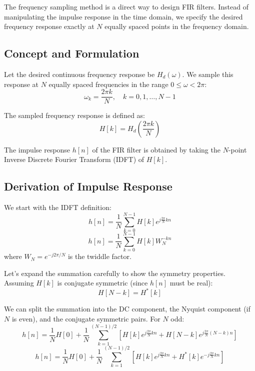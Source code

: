 \documentclass[11pt,a4paper]{article}
\begin{document}
The frequency sampling method is a direct way to design FIR filters. Instead of manipulating the impulse response in the time domain, we specify the desired frequency response exactly at $N$ equally spaced points in the frequency domain.

\subsection{Concept and Formulation}
Let the desired continuous frequency response be $H_d(\omega)$. We sample this response at $N$ equally spaced frequencies in the range $0 \le \omega < 2\pi$:
\begin{equation}
\omega_k = \frac{2\pi k}{N}, \quad k = 0, 1, \dots, N-1
\end{equation}

The sampled frequency response is defined as:
\begin{equation}
H[k] = H_d\left(\frac{2\pi k}{N}\right)
\end{equation}

The impulse response $h[n]$ of the FIR filter is obtained by taking the $N$-point Inverse Discrete Fourier Transform (IDFT) of $H[k]$.

\subsection{Derivation of Impulse Response}
We start with the IDFT definition:
\begin{equation}
h[n] = \frac{1}{N} \sum_{k=0}^{N-1} H[k] e^{j \frac{2\pi}{N} kn}
\end{equation}
\begin{equation}
h[n] = \frac{1}{N} \sum_{k=0}^{N-1} H[k] W_N^{-kn}
\end{equation}
where $W_N = e^{-j 2\pi / N}$ is the twiddle factor.

Let's expand the summation carefully to show the symmetry properties. Assuming $H[k]$ is conjugate symmetric (since $h[n]$ must be real):
\begin{equation}
H[N-k] = H^*[k]
\end{equation}

We can split the summation into the DC component, the Nyquist component (if $N$ is even), and the conjugate symmetric pairs. For $N$ odd:
\begin{equation}
h[n] = \frac{1}{N} H[0] + \frac{1}{N} \sum_{k=1}^{(N-1)/2} \left[ H[k] e^{j \frac{2\pi}{N} kn} + H[N-k] e^{j \frac{2\pi}{N} (N-k)n} \right]
\end{equation}
\begin{equation}
h[n] = \frac{1}{N} H[0] + \frac{1}{N} \sum_{k=1}^{(N-1)/2} \left[ H[k] e^{j \frac{2\pi}{N} kn} + H^*[k] e^{-j \frac{2\pi}{N} kn} \right]
\end{equation}
\end{document}
